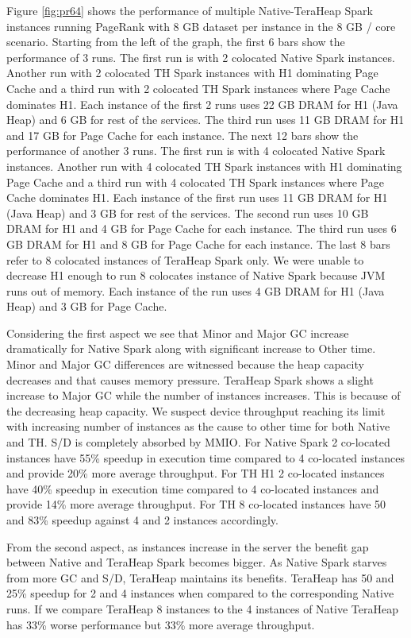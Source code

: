Figure \ref{fig:pr64} shows the performance of multiple
Native-TeraHeap Spark instances running PageRank with 8 GB
dataset per instance in the 8 GB / core scenario.
Starting from the left of the graph, the first 6 bars show the
performance of 3 runs. The first run is with 2 colocated Native Spark instances.
Another run with 2 colocated TH Spark instances with H1 dominating Page Cache
and a third run with 2 colocated TH Spark instances where Page Cache dominates H1.
Each instance of the first 2 runs uses 22 GB DRAM for H1 (Java Heap) and 6 GB for rest of the services.
The third run uses 11 GB DRAM for H1 and 17 GB for Page Cache for each instance. 
The next 12 bars show the performance of another 3 runs. The first run is with 4 colocated Native Spark instances.
Another run with 4 colocated TH Spark instances with H1 dominating Page Cache
and a third run with 4 colocated TH Spark instances where Page Cache dominates H1.
Each instance of the first run uses 11 GB DRAM for H1 (Java Heap) and 3 GB for rest of the services.
The second run uses 10 GB DRAM for H1 and 4 GB for Page Cache for each instance.
The third run uses 6 GB DRAM for H1 and 8 GB for Page Cache for each instance.
The last 8 bars refer to 8 colocated instances of TeraHeap Spark only. 
We were unable to decrease H1 enough to run 8 colocates instance of Native Spark
because JVM runs out of memory. Each instance of the run uses 4 GB DRAM for H1 (Java Heap) and 3 GB for Page Cache.

Considering the first aspect we see that Minor and Major GC increase dramatically for Native Spark along with significant increase to Other time. Minor and Major GC differences are witnessed because the heap capacity decreases and that causes memory pressure. TeraHeap Spark shows a slight increase to Major GC while the number of instances increases. This is because of the decreasing heap capacity. We suspect device throughput reaching its limit with increasing number of instances as the cause to other time for both Native and TH. S/D is completely absorbed by MMIO. For Native Spark 2 co-located instances have 55\% speedup in execution time compared to 4 co-located instances and provide 20\% more average throughput. For TH H1 2 co-located instances have 40\% speedup in execution time compared to 4 co-located instances and provide 14\% more average throughput. For TH 8 co-located instances have 50 and 83\% speedup against 4 and 2 instances accordingly.

From the second aspect, as instances increase in the server the benefit gap between Native and TeraHeap Spark becomes bigger. As Native Spark starves from more GC and S/D, TeraHeap maintains its benefits. TeraHeap has 50 and 25\% speedup for 2 and 4 instances when compared to the corresponding Native runs. If we compare TeraHeap 8 instances to the 4 instances of Native TeraHeap has 33\% worse performance but 33\% more average throughput.

